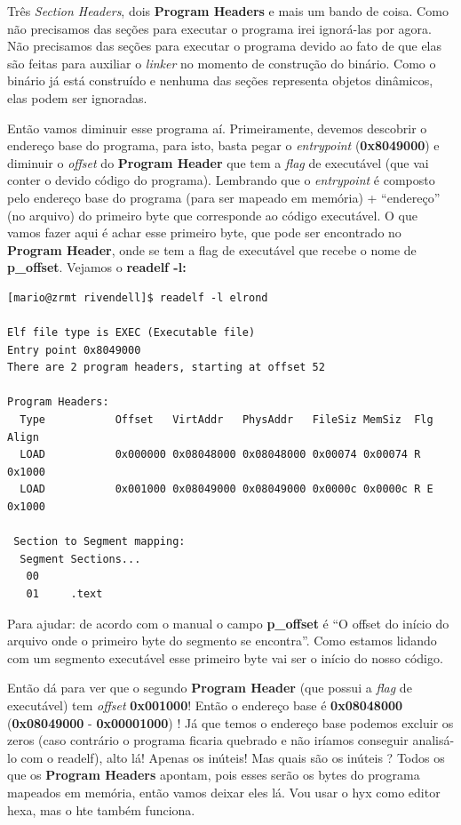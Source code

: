\documentclass[12pt]{article}
\begin{document}
 Três \emph{Section Headers}, dois \textbf{Program Headers} e mais um bando de coisa. Como não precisamos das seções para executar o programa irei ignorá-las por agora. Não precisamos das seções para executar o programa devido ao fato de que elas são feitas para auxiliar o \emph{linker} no momento de construção do binário. Como o binário já está construído e nenhuma das seções representa objetos dinâmicos, elas podem ser ignoradas.

Então vamos diminuir esse programa aí. Primeiramente, devemos descobrir o endereço base do programa, para isto, basta pegar o \emph{entrypoint} (\textbf{0x8049000}) e diminuir o \emph{offset} do \textbf{Program Header} que tem a \emph{flag} de executável (que vai conter o devido código do programa). Lembrando que o \emph{entrypoint} é composto pelo endereço base do programa (para ser mapeado em memória) + “endereço” (no arquivo) do primeiro byte que corresponde ao código executável. O que vamos fazer aqui é achar esse primeiro byte, que pode ser encontrado no \textbf{Program Header}, onde se tem a flag de executável que recebe o nome de \textbf{p\_offset}. Vejamos o \textbf{readelf -l:}



\begin{verbatim}
[mario@zrmt rivendell]$ readelf -l elrond

Elf file type is EXEC (Executable file)
Entry point 0x8049000
There are 2 program headers, starting at offset 52

Program Headers:
  Type           Offset   VirtAddr   PhysAddr   FileSiz MemSiz  Flg Align
  LOAD           0x000000 0x08048000 0x08048000 0x00074 0x00074 R   0x1000
  LOAD           0x001000 0x08049000 0x08049000 0x0000c 0x0000c R E 0x1000

 Section to Segment mapping:
  Segment Sections...
   00
   01     .text
\end{verbatim}

 Para ajudar: de acordo com o manual o campo \textbf{p\_offset} é “O offset do início do arquivo onde o primeiro byte do segmento se encontra”. Como estamos lidando com um segmento executável esse primeiro byte vai ser o início do nosso código.

Então dá para ver que o segundo \textbf{Program Header} (que possui a \emph{flag} de executável) tem \emph{offset} \textbf{0x001000}! Então o endereço base é \textbf{0x08048000} (\textbf{0x08049000} - \textbf{0x00001000}) ! Já que temos o endereço base podemos excluir os zeros (caso contrário o programa ficaria quebrado e não iríamos conseguir analisá-lo com o readelf), alto lá! Apenas os inúteis! Mas quais são os inúteis ? Todos os que os \textbf{Program Headers} apontam, pois esses serão os  bytes do programa mapeados em memória, então vamos deixar eles lá. Vou usar o hyx como editor hexa, mas o hte também funciona.
\end{document}
